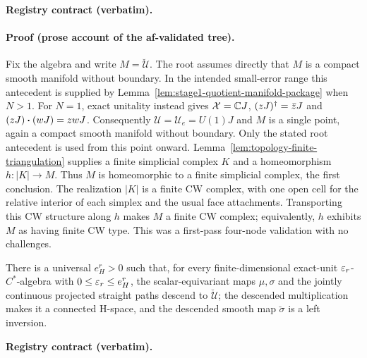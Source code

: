 \noindent\textbf{Registry contract (verbatim).}

\paragraph{Proof (prose account of the af-validated tree).}
Fix the algebra and write $M=\breve{\mathcal U}$.
The root assumes directly that $M$ is a compact smooth manifold without boundary.
In the intended small-error range this antecedent is supplied by
Lemma~\ref{lem:stage1-quotient-manifold-package} when $N>1$.
For $N=1$, exact unitality instead gives $\mathcal X=\mathbb CJ$,
$(zJ)^{\dagger}=\bar zJ$ and $(zJ)\mathbin{\bm{\cdot}}(wJ)=zwJ$.
Consequently $\mathcal U=\mathcal U_e=U(1)J$ and $M$ is a single point,
again a compact smooth manifold without boundary.
Only the stated root antecedent is used from this point onward.
Lemma~\ref{lem:topology-finite-triangulation} supplies a finite simplicial complex $K$
and a homeomorphism $h:|K|\to M$.
Thus $M$ is homeomorphic to a finite simplicial complex, the first conclusion.
The realization $|K|$ is a finite CW complex, with one open cell for the relative
interior of each simplex and the usual face attachments.
Transporting this CW structure along $h$ makes $M$ a finite CW complex;
equivalently, $h$ exhibits $M$ as having finite CW type.
This was a first-pass four-node validation with no challenges.

\begin{lemma}\label{lem:stage1-quotient-left-inversion}
There is a universal $e^{r}_{H}>0$ such that, for every finite-dimensional exact-unit $\varepsilon_r$-$C^*$-algebra with $0\le\varepsilon_r\le e^{r}_{H}$,
the scalar-equivariant maps $\mu,\sigma$ and the jointly continuous projected straight
paths descend to $\breve{\mathcal U}$; the descended multiplication makes it a connected
H-space, and the descended smooth map $\breve\sigma$ is a left inversion.
\end{lemma}

\noindent\textbf{Registry contract (verbatim).}

